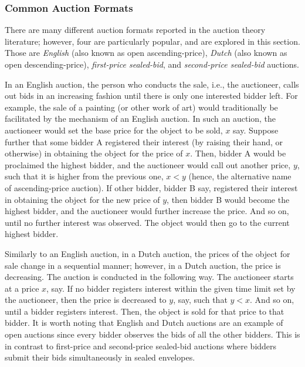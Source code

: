 \subsubsection{Common Auction Formats} %
\label{ssub:common_auction_formats_dmp}
There are many different auction formats reported in the auction theory literature; however, four are particularly popular, and are explored in this section. Those are \emph{English} (also known as open ascending-price), \emph{Dutch} (also known as open descending-price), \emph{first-price sealed-bid}, and \emph{second-price sealed-bid} auctions.

In an English auction, the person who conducts the sale, i.e., the auctioneer, calls out bids in an increasing fashion until there is only one interested bidder left. For example, the sale of a painting (or other work of art) would traditionally be facilitated by the mechanism of an English auction. In such an auction, the auctioneer would set the base price for the object to be sold, $x$ say. Suppose further that some bidder A registered their interest (by raising their hand, or otherwise) in obtaining the object for the price of $x$. Then, bidder A would be proclaimed the highest bidder, and the auctioneer would call out another price, $y$, such that it is higher from the previous one, $x < y$ (hence, the alternative name of ascending-price auction). If other bidder, bidder B say, registered their interest in obtaining the object for the new price of $y$, then bidder B would become the highest bidder, and the auctioneer would further increase the price. And so on, until no further interest was observed. The object would then go to the current highest bidder.

Similarly to an English auction, in a Dutch auction, the prices of the object for sale change in a sequential manner; however, in a Dutch auction, the price is decreasing. The auction is conducted in the following way. The auctioneer starts at a price $x$, say. If no bidder registers interest within the given time limit set by the auctioneer, then the price is decreased to $y$, say, such that $y < x$. And so on, until a bidder registers interest. Then, the object is sold for that price to that bidder. It is worth noting that English and Dutch auctions are an example of open auctions since every bidder observes the bids of all the other bidders. This is in contrast to first-price and second-price sealed-bid auctions where bidders submit their bids simultaneously in sealed envelopes.

